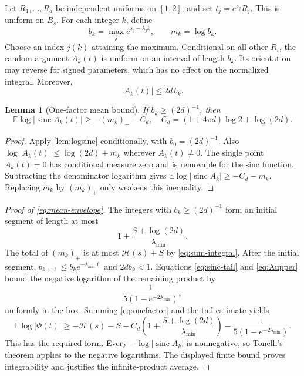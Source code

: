 \documentclass[11pt,a4paper]{article}
\numberwithin{equation}{section}
\newtheorem{lemma}[theorem]{Lemma}
\theoremstyle{definition}
\theoremstyle{remark}\newtheorem{remark}[theorem]{Remark}
\newcommand{\E}{\mathbb E}\newcommand{\Prob}{\mathbb P}
\newcommand{\sinc}{\operatorname{sinc}}
\newcommand{\He}{\mathcal H}
\begin{document}
Let $R_1,\ldots,R_d$ be independent uniforms on $[1,2]$, and set
$t_j=e^{s_j}R_j$. This is uniform on $B_s$. For each integer $k$, define
\begin{equation}
 b_k=\max_j e^{s_j-\lambda_jk},\qquad
 m_k=\log b_k.
 \label{eq:bk}
\end{equation}
Choose an index $j(k)$ attaining the maximum. Conditional on all other
$R_i$, the random argument $A_k(t)$ is uniform on an interval of length
$b_k$. Its orientation may reverse for signed parameters, which has no
effect on the normalized integral. Moreover,
\begin{equation}
 |A_k(t)|\le2d\,b_k.
 \label{eq:Aupper}
\end{equation}

\begin{lemma}[One-factor mean bound]
\label{lem:onefactor}
If $b_k\ge(2d)^{-1}$, then
\begin{equation}
 \E\log|\sinc A_k(t)|\ge-(m_k)_+-C_d,
 \quad C_d=(1+4\pi d)\log2+\log(2d).
 \label{eq:onefactor}
\end{equation}
\end{lemma}
\begin{proof}
Apply \cref{lem:logsine} conditionally, with $b_0=(2d)^{-1}$. Also
$\log|A_k(t)|\le\log(2d)+m_k$ wherever $A_k(t)\ne0$. The single point
$A_k(t)=0$ has conditional measure zero and is removable for the sinc
function. Subtracting the denominator logarithm gives
$\E\log|\sinc A_k|\ge-C_d-m_k$. Replacing $m_k$ by $(m_k)_+$ only weakens
this inequality.
\end{proof}

\begin{proof}[Proof of \eqref{eq:mean-envelope}]
The integers with $b_k\ge(2d)^{-1}$ form an initial segment of length at most
\[
 1+\frac{S+\log(2d)}{\lambda_{\min}}.
\]
The total of $(m_k)_+$ is at most $\He(s)+S$ by
\eqref{eq:sum-integral}. After the initial segment,
$b_{k+\ell}\le b_ke^{-\lambda_{\min}\ell}$ and $2db_k<1$.
Equations \eqref{eq:sinc-tail} and \eqref{eq:Aupper} bound the negative
logarithm of the remaining product by
\begin{equation}
 \frac1{5(1-e^{-2\lambda_{\min}})},
 \label{eq:tailconstant}
\end{equation}
uniformly in the box. Summing \eqref{eq:onefactor} and the tail estimate yields
\begin{equation}
 \E\log|\Phi(t)|\ge-\He(s)-S
 -C_d\left(1+\frac{S+\log(2d)}{\lambda_{\min}}\right)
 -\frac1{5(1-e^{-2\lambda_{\min}})}.
 \label{eq:explicitmean}
\end{equation}
This has the required form. Every $-\log|\sinc A_k|$ is nonnegative, so
Tonelli's theorem applies to the negative logarithms. The displayed finite
bound proves integrability and justifies the infinite-product average.
\end{proof}
\end{document}
